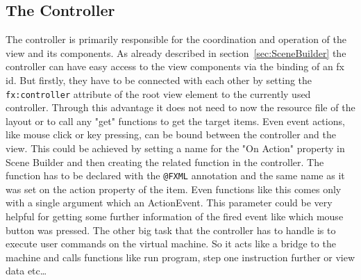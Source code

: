 \subsection{The Controller}
The controller is primarily responsible for the coordination and operation of the view and its components. As already described in section~\ref{sec:SceneBuilder} the controller can have easy access to the view components via the binding of an fx id. But firstly, they have to be connected with each other by setting the \texttt{fx:controller} attribute of the root view element to the currently used controller. Through this advantage it does not need to now the resource file of the layout or to call any "get" functions to get the target items. Even event actions, like mouse click or key pressing, can be bound between the controller and the view. This could be achieved by setting a name for the "On Action" property in Scene Builder and then creating the related function in the controller. The function has to be declared with the  \texttt{@FXML} annotation and the same name as it was set on the action property of the item. Even functions like this comes only with a single argument which an ActionEvent. This parameter could be very helpful for getting some further information of the fired event like which mouse button was pressed.
The other big task that the controller has to handle is to execute user commands on the virtual machine. So it acts like a bridge to the machine and calls functions like run program, step one instruction further or view data etc\ldots 

